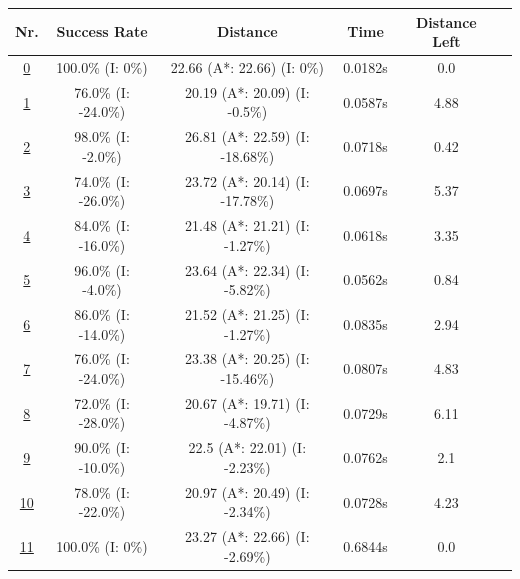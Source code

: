 \begin{table}[h!] 
\footnotesize
\centering


\begin{tabular}{|cc|c|c|c|c|c|}
\hline
\multicolumn{2}{|c|}{\textbf{Nr.}} & \textbf{Success Rate} & \textbf{Distance} & \textbf{Time} & \textbf{Distance Left}\\
\hline
\hline
\multicolumn{2}{|c|}{\cellcolor{lightgray!20} \hyperref[tab: evalalgorithms]{0}} & 100.0\% (I: 0\%) & 22.66 (A*: 22.66) (I: 0\%) & 0.0182s & 0.0\\
\hline
\hline
\multicolumn{2}{|c|}{\cellcolor{red!40} \hyperref[tab: evalalgorithms]{1}} & 76.0\% (I: -24.0\%) & 20.19 (A*: 20.09) (I: -0.5\%) & 0.0587s & 4.88\\
\hline
\multicolumn{2}{|c|}{\cellcolor{red!20} \hyperref[tab: evalalgorithms]{2}} & 98.0\% (I: -2.0\%) & 26.81 (A*: 22.59) (I: -18.68\%) & 0.0718s & 0.42\\
\hline
\multicolumn{2}{|c|}{\cellcolor{red!20} \hyperref[tab: evalalgorithms]{3}} & 74.0\% (I: -26.0\%) & 23.72 (A*: 20.14) (I: -17.78\%) & 0.0697s & 5.37\\
\hline
\multicolumn{2}{|c|}{\cellcolor{red!20} \hyperref[tab: evalalgorithms]{4}} & 84.0\% (I: -16.0\%) & 21.48 (A*: 21.21) (I: -1.27\%) & 0.0618s & 3.35\\
\hline
\multicolumn{2}{|c|}{\cellcolor{red!20} \hyperref[tab: evalalgorithms]{5}} & 96.0\% (I: -4.0\%) & 23.64 (A*: 22.34) (I: -5.82\%) & 0.0562s & 0.84\\
\hline
\hline
\multicolumn{2}{|c|}{\cellcolor{blue!20} \hyperref[tab: evalalgorithms]{6}} & 86.0\% (I: -14.0\%) & 21.52 (A*: 21.25) (I: -1.27\%) & 0.0835s & 2.94\\
\hline
\multicolumn{2}{|c|}{\cellcolor{blue!40} \hyperref[tab: evalalgorithms]{7}} & 76.0\% (I: -24.0\%) & 23.38 (A*: 20.25) (I: -15.46\%) & 0.0807s & 4.83\\
\hline
\multicolumn{2}{|c|}{\cellcolor{blue!20} \hyperref[tab: evalalgorithms]{8}} & 72.0\% (I: -28.0\%) & 20.67 (A*: 19.71) (I: -4.87\%) & 0.0729s & 6.11\\
\hline
\multicolumn{2}{|c|}{\cellcolor{blue!20} \hyperref[tab: evalalgorithms]{9}} & 90.0\% (I: -10.0\%) & 22.5 (A*: 22.01) (I: -2.23\%) & 0.0762s & 2.1\\
\hline
\multicolumn{2}{|c|}{\cellcolor{blue!20} \hyperref[tab: evalalgorithms]{10}} & 78.0\% (I: -22.0\%) & 20.97 (A*: 20.49) (I: -2.34\%) & 0.0728s & 4.23\\
\hline
\hline
\multicolumn{2}{|c|}{\cellcolor{orange!40} \hyperref[tab: evalalgorithms]{11}} & 100.0\% (I: 0\%) & 23.27 (A*: 22.66) (I: -2.69\%) & 0.6844s & 0.0\\

\end{tabular}
\end{table}

